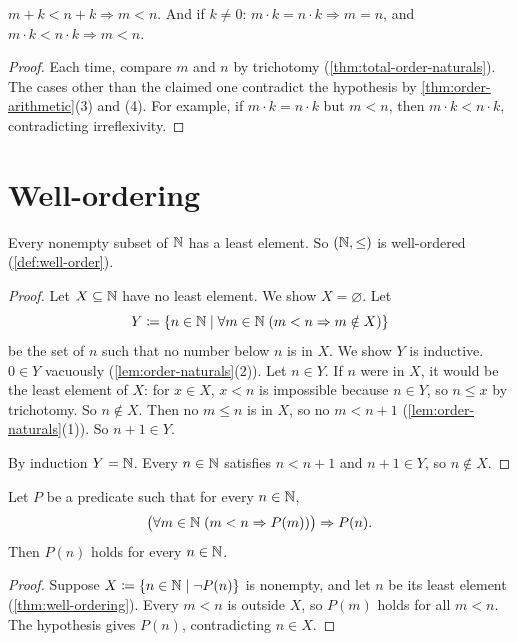 \begin{corollary}[Cancellation]
\label{cor:cancellation-naturals}
$m + k < n + k \Rightarrow m < n$. And if $k \neq 0$: $m \cdot k = n \cdot k
\Rightarrow m = n$, and $m \cdot k < n \cdot k \Rightarrow m < n$.
\end{corollary}

\begin{proof}
Each time, compare $m$ and $n$ by trichotomy (\cref{thm:total-order-naturals}).
The cases other than the claimed one contradict the hypothesis by
\cref{thm:order-arithmetic}(3) and (4). For example, if $m \cdot k = n \cdot k$ but
$m < n$, then $m \cdot k < n \cdot k$, contradicting irreflexivity.
\end{proof}

\section{Well-ordering}

\begin{theorem}
\label{thm:well-ordering}
Every nonempty subset of $\mathbb{N}$ has a least element. So $(\mathbb{N}, \le)$ is well-ordered
(\cref{def:well-order}).
\end{theorem}

\begin{proof}
Let $X \subseteq \mathbb{N}$ have no least element. We show $X = \varnothing$. Let
\[
  Y \coloneqq \lbrace n \in \mathbb{N} \mid \forall m \in \mathbb{N}\; (m < n \Rightarrow m \notin X) \rbrace
\]
be the set of $n$ such that no number below $n$ is in $X$. We show $Y$ is
inductive. $0 \in Y$ vacuously (\cref{lem:order-naturals}(2)). Let $n \in Y$. If
$n$ were in $X$, it would be the least element of $X$: for $x \in X$, $x < n$ is
impossible because $n \in Y$, so $n \le x$ by trichotomy. So $n \notin X$. Then no
$m \le n$ is in $X$, so no $m < n + 1$ (\cref{lem:order-naturals}(1)). So $n + 1
\in Y$.

By induction $Y = \mathbb{N}$. Every $n \in \mathbb{N}$ satisfies $n < n + 1$ and $n + 1 \in Y$, so
$n \notin X$.
\end{proof}

\begin{corollary}
\label{cor:strong-induction}
Let $P$ be a predicate such that for every $n \in \mathbb{N}$,
\[
  \bigl( \forall m \in \mathbb{N}\; (m < n \Rightarrow P(m)) \bigr) \Rightarrow P(n).
\]
Then $P(n)$ holds for every $n \in \mathbb{N}$.
\end{corollary}

\begin{proof}
Suppose $X \coloneqq \lbrace n \in \mathbb{N} \mid \lnot P(n) \rbrace$ is nonempty, and let $n$ be its
least element (\cref{thm:well-ordering}). Every $m < n$ is outside $X$, so $P(m)$
holds for all $m < n$. The hypothesis gives $P(n)$, contradicting $n \in X$.
\end{proof}

